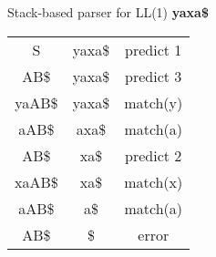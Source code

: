 \documentclass{article}
\begin{document}
Stack-based parser for LL(1) \textbf{yaxa\$}\newline
\begin{tabular}{|c|c|c|}
\hline
	\thead{Parse stack} & \thead{Remaining Input} & \thead{Parser action}\\
\hline
	S      & yaxa\$ & predict 1\\
\hline
	AB\$   & yaxa\$ & predict 3\\
\hline
	yaAB\$ & yaxa\$ & match(y)\\
\hline
	aAB\$  & axa\$  & match(a)\\
\hline
	AB\$   & xa\$   & predict 2\\
\hline
	xaAB\$ & xa\$   & match(x)\\
\hline
	aAB\$  & a\$    & match(a)\\
\hline
	AB\$   & \$     & error\\
\hline
\end{tabular}
\end{document}
